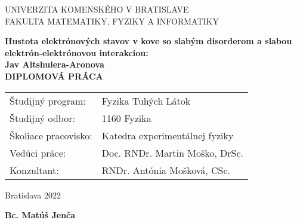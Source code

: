 \newpage
\thispagestyle{empty}
\begin{center}
{\large UNIVERZITA KOMENSKÉHO V BRATISLAVE \\
FAKULTA MATEMATIKY, FYZIKY A INFORMATIKY}
\end{center}


\vspace{5cm}
\begin{center}
{\large \bf Hustota elektrónových stavov v kove so slabým disorderom a slabou elektrón-elektrónovou interakciou:\\ Jav Altshulera-Aronova\\
\vspace{3cm}
DIPLOMOVÁ PRÁCA}
\end{center}

\vfill
\begin{flushleft}
\begin{tabular}{ll}
Študijný program: & Fyzika Tuhých Látok \\
Študijný odbor: & 1160 Fyzika \\
Školiace pracovisko: & Katedra experimentálnej fyziky \\
Vedúci práce: & Doc. RNDr. Martin Moško, DrSc. \\
Konzultant: & RNDr. Antónia Mošková, CSc. \\
\end{tabular}
\end{flushleft}

\vfill
%
\begin{multicols}{2}
\begin{flushleft} Bratislava 2022 \end{flushleft}
\begin{flushright} {\bf Bc. Matúš Jenča} \end{flushright}
\end{multicols}

